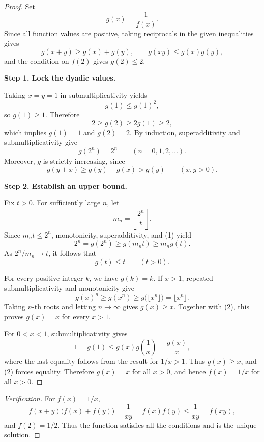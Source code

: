 
\begin{dlsummary}[title={\bfseries Solution 7. The Harmonic Squeeze},breakable]

\begin{proof}
Set
\[
g(x)=\frac1{f(x)}.
\]
Since all function values are positive, taking reciprocals in the given
inequalities gives
\[
g(x+y)\ge g(x)+g(y),
\qquad
g(xy)\le g(x)g(y),
\]
and the condition on $f(2)$ gives $g(2)\le2$.

\medskip
\noindent
\textbf{Step 1. Lock the dyadic values.}

Taking $x=y=1$ in submultiplicativity yields
\[
g(1)\le g(1)^2,
\]
so $g(1)\ge1$. Therefore
\[
2\ge g(2)\ge2g(1)\ge2,
\]
which implies $g(1)=1$ and $g(2)=2$. By induction, superadditivity and
submultiplicativity give
\[
g(2^n)=2^n
\qquad(n=0,1,2,\ldots). \tag{1}
\]
Moreover, $g$ is strictly increasing, since
\[
g(y+x)\ge g(y)+g(x)>g(y)
\qquad(x,y>0).
\]

\medskip
\noindent
\textbf{Step 2. Establish an upper bound.}

Fix $t>0$. For sufficiently large $n$, let
\[
m_n=\left\lfloor\frac{2^n}{t}\right\rfloor.
\]
Since $m_nt\le2^n$, monotonicity, superadditivity, and (1) yield
\[
2^n=g(2^n)\ge g(m_nt)\ge m_ng(t).
\]
As $2^n/m_n\to t$, it follows that
\[
g(t)\le t\qquad(t>0). \tag{2}
\]

\medskip

For every positive integer $k$, we have $g(k)=k$. If $x>1$, repeated
submultiplicativity and monotonicity give
\[
g(x)^n\ge g(x^n)
\ge g\bigl(\lfloor x^n\rfloor\bigr)
=\lfloor x^n\rfloor.
\]
Taking $n$-th roots and letting $n\to\infty$ gives $g(x)\ge x$.
Together with (2), this proves $g(x)=x$ for every $x>1$.

For $0<x<1$, submultiplicativity gives
\[
1=g(1)\le g(x)g\left(\frac1x\right)=\frac{g(x)}x,
\]
where the last equality follows from the result for $1/x>1$. Thus
$g(x)\ge x$, and (2) forces equality. Therefore $g(x)=x$ for all
$x>0$, and hence $f(x)=1/x$ for all $x>0$.
\end{proof}

\begin{proof}[Verification]
For $f(x)=1/x$,
\[
f(x+y)\bigl(f(x)+f(y)\bigr)
=\frac1{xy}
=f(x)f(y)
\le \frac1{xy}=f(xy),
\]
and $f(2)=1/2$. Thus the function satisfies all the conditions and is
the unique solution.
\end{proof}

\end{dlsummary}